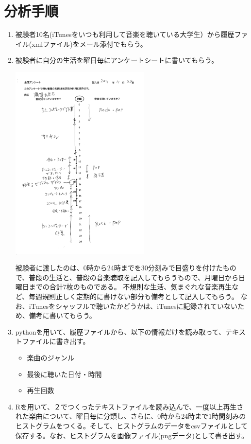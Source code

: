 \documentclass{jsarticle}
\begin{document}
\section{分析手順}
\begin{enumerate}
\item
被験者10名(iTunesをいつも利用して音楽を聴いている大学生）から履歴ファイル(xmlファイル)をメール添付でもらう。

\item
被験者に自分の生活を曜日毎にアンケートシートに書いてもらう。
\begin{center}
\includegraphics[width=7cm]{musicLifeSheet_sample.pdf}
\end{center}

被験者に渡したのは、0時から24時までを30分刻みで目盛りを付けたもので、普段の生活と、普段の音楽聴取を記入してもらうもので、月曜日から日曜日までの合計7枚のものである。
不規則な生活、気まぐれな音楽再生など、毎週規則正しく定期的に書けない部分も備考として記入してもらう。
なお、iTunesをシャッフルで聴いたかどうかは、iTunesに記録されていないため、備考に書いてもらう。
\item
pythonを用いて、履歴ファイルから、以下の情報だけを読み取って、テキストファイルに書き出す。
\begin{itemize}
\item
楽曲のジャンル
\item
最後に聴いた日付・時間
\item
再生回数
\end{itemize}

\item
Rを用いて、２でつくったテキストファイルを読み込んで、一度以上再生された楽曲について、曜日毎に分類し、さらに、0時から24時まで1時間刻みのヒストグラムをつくる。そして、ヒストグラムのデータをcsvファイルとして保存する。なお、ヒストグラムを画像ファイル(pngデータ)として書き出す。


\end{enumerate}
\end{document}
